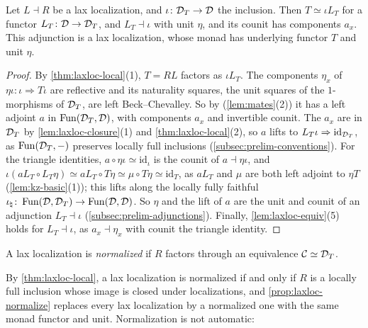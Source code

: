 \begin{prop}
\label{prop:laxloc-normalize}
%
Let $L \dashv R$ be a lax localization, and
$\iota\colon \mathcal{D}_{T} \to \mathcal{D}$
the inclusion. Then
$T \simeq \iota L_{T}$
for a functor
$L_{T}\colon \mathcal{D} \to \mathcal{D}_{T}$,
and
$L_{T} \dashv \iota$
with unit $\eta$, and its counit has components $a_{x}$. This adjunction is a
lax localization, whose monad has underlying functor $T$ and unit $\eta$.
\end{prop}

\begin{proof}
%
By \cref{thm:laxloc-local}(1), $T = RL$ factors as $\iota L_{T}$. The
components $\eta_{x}$ of
$\eta\iota\colon \iota \Rightarrow T\iota$
are reflective and its naturality squares, the unit squares of the
$1$-morphisms of $\mathcal{D}_{T}$, are left Beck--Chevalley. So by
\cite[Cor.~5.2.12]{abellangagnahaugseng2024straightening} (\cref{lem:mates}(2))
it has a left adjoint $a$ in $\operatorname{Fun}(\mathcal{D}_{T},\mathcal{D})$, with components $a_{x}$ and
invertible counit. The $a_{x}$ are in $\mathcal{D}_{T}$ by \cref{lem:laxloc-closure}(1)
and \cref{thm:laxloc-local}(2), so $a$ lifts to
$L_{T}\iota \Rightarrow \mathrm{id}_{\mathcal{D}_{T}}$,
as $\operatorname{Fun}(\mathcal{D}_{T},-)$ preserves locally full inclusions
(\cref{subsec:prelim-conventions}). For the triangle identities,
$a \circ \eta\iota \simeq \mathrm{id}_{\iota}$
is the counit of
$a \dashv \eta\iota$,
and
$\iota(aL_{T} \circ L_{T}\eta) \simeq aL_{T} \circ T\eta \simeq \mu \circ T\eta
\simeq \mathrm{id}_{T}$,
as $aL_{T}$ and $\mu$ are both left adjoint to $\eta T$
(\cref{lem:kz-basic}(1)); this lifts along the locally fully faithful
$\iota_{\natural}\colon \operatorname{Fun}(\mathcal{D},\mathcal{D}_{T}) \to \operatorname{Fun}(\mathcal{D},\mathcal{D})$.
So $\eta$ and the lift of $a$ are the unit and counit of an adjunction
$L_{T} \dashv \iota$
(\cref{subsec:prelim-adjunctions}).
Finally, \cref{lem:laxloc-equiv}(5) holds for
$L_{T} \dashv \iota$,
as
$a_{x} \dashv \eta_{x}$
with counit the triangle identity.
\end{proof}

\begin{defi}
\label{def:laxloc-normalized}
%
A lax localization is \emph{normalized} if $R$ factors through an equivalence
$\mathcal{C} \simeq \mathcal{D}_{T}$.
\end{defi}

%
By \cref{thm:laxloc-local}, a lax localization is normalized if and only if $R$
is a locally full inclusion whose image is closed under localizations, and
\cref{prop:laxloc-normalize} replaces every lax localization by a normalized one
with the same monad functor and unit. Normalization is not automatic:

